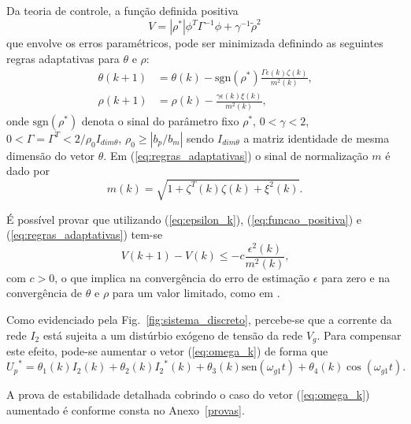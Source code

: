   Da teoria de controle, a função definida positiva
  \begin{equation}
    V = |\rho^*| \phi^T \Gamma^{-1} \phi + \gamma^{-1} {\tilde{\rho}}^2
    \label{eq:funcao_positiva}
  \end{equation}
  que envolve os erros paramétricos, pode ser minimizada definindo as seguintes regras adaptativas para $\theta$ e $\rho$:
  \begin{subequations}
    \begin{align}
      \theta(k + 1) & = \theta(k) - \text{sgn}(\rho^*)\frac{\Gamma \epsilon(k)\zeta(k)}{m^2(k)} \text{,}\\
      \rho(k + 1) & = \rho(k) - \frac{\gamma \epsilon(k) \xi(k)}{m^2(k)} \text{,}
    \end{align}
    \label{eq:regras_adaptativas}
  \end{subequations}
  onde $\text{sgn}(\rho^*)$ denota o sinal do parâmetro fixo $\rho^*$, $0 < \gamma < 2$, $0 < \Gamma = \Gamma^T < 2/\rho_0 I_{dim \theta}$, $\rho_0 \geq |b_p / b_m|$ sendo $I_{dim \theta}$ a matriz identidade de mesma dimensão do vetor $\theta$. Em (\ref{eq:regras_adaptativas}) o sinal de normalização $m$ é dado por
  \begin{equation}
    m(k) = \sqrt{1 + \zeta^T(k) \zeta(k) + \xi^2(k)} \text{.}
  \end{equation}

  É possível provar que utilizando (\ref{eq:epsilon_k}), (\ref{eq:funcao_positiva}) e (\ref{eq:regras_adaptativas}) tem-se
  \begin{equation}
    V(k + 1) - V(k) \leq -c \frac{\epsilon^2(k)}{m^2(k)} \text{,}
  \end{equation}
  com $c > 0$, o que implica na convergência do erro de estimação $\epsilon$ para zero e na convergência de $\theta$ e $\rho$ para um valor limitado, como em \cite{ref:TAO}.

  Como evidenciado pela Fig.~\ref{fig:sistema_discreto}, percebe-se que a corrente da rede $I_2$ está sujeita a um distúrbio exógeno de tensão da rede $V_g$. Para compensar este efeito, pode-se aumentar o vetor (\ref{eq:omega_k}) de forma que
  \begin{equation}
    {U_p}^* = \theta_1(k) I_2(k) + \theta_2(k) {I_2}^*(k)+
      \theta_3(k) \text{sen}(\omega_{g1}t) + \theta_4(k) \cos(\omega_{g1} t) \text{.}
  \end{equation}

  A prova de estabilidade detalhada cobrindo o caso do vetor (\ref{eq:omega_k}) aumentado é conforme consta no Anexo~\ref{provas}.



